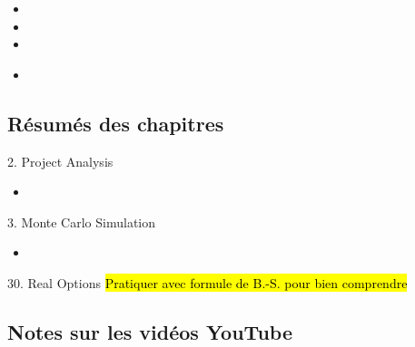 \begin{ASM_chapter}
\begin{itemize}
	\item	{}
	\item	{}
	\item	{}
\end{itemize}
\end{ASM_chapter}

\begin{YTB_vids}
\begin{itemize}
	\item	
\end{itemize}
\end{YTB_vids}

\subsection{Résumés des chapitres}

\begin{CHPT_SUMM_AUTO}[label = {L.-2}]{2. Project Analysis}
	\begin{itemize}
		\item	
	\end{itemize}
\end{CHPT_SUMM_AUTO}

\begin{CHPT_SUMM_AUTO}[label = {L.-3}]{3. Monte Carlo Simulation}
	\begin{itemize}
		\item	
	\end{itemize}
\end{CHPT_SUMM_AUTO}

\begin{CHPT_SUMM_AUTO}[label = {L.-30}]{30. Real Options}
\hl{Pratiquer avec formule de B.-S. pour bien comprendre}
\end{CHPT_SUMM_AUTO}

\subsection{Notes sur les vidéos YouTube}


